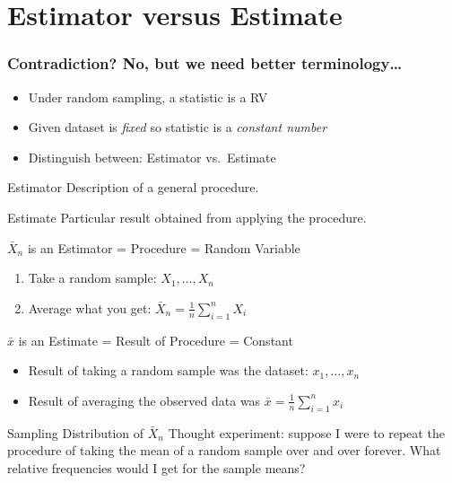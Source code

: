 \section{Estimator versus Estimate}
\begin{frame}
  \frametitle{Contradiction? No, but we need better terminology\dots}
  \begin{itemize}
    \item Under random sampling, a statistic is a RV
    \item Given dataset is \emph{fixed} so statistic is a \emph{constant number}
    \item Distinguish between: \alert{Estimator} vs.\ \alert{Estimate}
  \end{itemize}

  \begin{alertblock}{Estimator}
   Description of a general procedure. 
  \end{alertblock}
  \begin{alertblock}{Estimate}
    Particular result obtained from applying the procedure.
  \end{alertblock}
\end{frame}
\begin{frame}
  \begin{block}{$\bar{X}_n$ is an Estimator = Procedure = Random Variable}
\begin{enumerate}
\item Take a random sample: $X_1, \hdots, X_n \quad$ 
\item Average what you get: $\bar{X}_n = \frac{1}{n}\sum_{i=1}^n X_i\quad$ 
\end{enumerate}
\end{block}

\pause
\begin{block}{$\bar{x}$ is an Estimate = Result of Procedure = Constant}
 \begin{itemize}
\item Result of taking a random sample was the dataset: $x_1, \hdots, x_n$ 
\item Result of averaging the observed data was $\bar{x} = \frac{1}{n}\sum_{i=1}^n x_i$ 
\end{itemize}
\end{block}

\pause
\begin{block}{Sampling Distribution of $\bar{X}_n$}
  \alert{Thought experiment:} suppose I were to repeat the procedure of taking the mean of a random sample over and over \alert{forever}. What \alert{relative frequencies} would I get for the sample means?
\end{block}

\end{frame}


